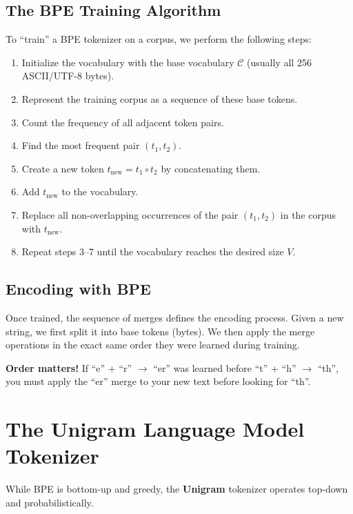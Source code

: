 \subsection{The BPE Training Algorithm}
To ``train'' a BPE tokenizer on a corpus, we perform the following steps:
\begin{enumerate}
    \item Initialize the vocabulary with the base vocabulary $\mathcal{C}$ (usually all 256 ASCII/UTF-8 bytes).
    \item Represent the training corpus as a sequence of these base tokens.
    \item Count the frequency of all adjacent token pairs.
    \item Find the most frequent pair $(t_1, t_2)$.
    \item Create a new token $t_{\text{new}} = t_1 \circ t_2$ by concatenating them.
    \item Add $t_{\text{new}}$ to the vocabulary.
    \item Replace all non-overlapping occurrences of the pair $(t_1, t_2)$ in the corpus with $t_{\text{new}}$.
    \item Repeat steps 3--7 until the vocabulary reaches the desired size $V$.
\end{enumerate}

\subsection{Encoding with BPE}
Once trained, the sequence of merges defines the encoding process. Given a new string, we first split it into base tokens (bytes). We then apply the merge operations in the exact same order they were learned during training.

\begin{warningbox}
\textbf{Order matters!} If ``e'' + ``r'' $\to$ ``er'' was learned before ``t'' + ``h'' $\to$ ``th'', you must apply the ``er'' merge to your new text before looking for ``th''.
\end{warningbox}

\section{The Unigram Language Model Tokenizer}

While BPE is bottom-up and greedy, the \textbf{Unigram} tokenizer operates top-down and probabilistically.

